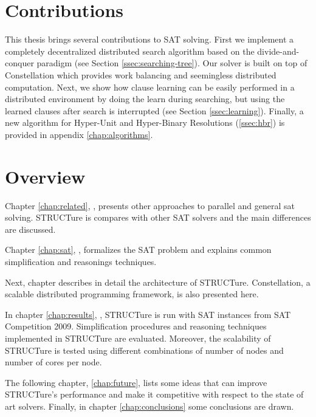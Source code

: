 \section{Contributions}

This thesis brings several contributions to SAT solving. First
we implement a completely decentralized distributed search
algorithm based on the divide-and-conquer paradigm (see Section
\ref{ssec:searching-tree}).  Our solver is built on top of
Constellation which provides work balancing and seemingless
distributed computation.  Next, we show how clause learning can be
easily performed in a distributed environment by doing the learn
during searching, but using the learned clauses after search
is interrupted (see Section \ref{ssec:learning}).  Finally,
a new algorithm for Hyper-Unit and Hyper-Binary Resolutions
(\ref{ssec:hbr}) is provided in appendix \ref{chap:algorithms}.


\section{Overview}

Chapter \ref{chap:related}, , presents other
approaches to parallel and general sat solving. STRUCTure is compares
with other SAT solvers and the main differences are discussed.

Chapter \ref{chap:sat}, , formalizes the SAT
problem and explains common simplification and reasonings techniques.

Next, chapter  describes in detail the
architecture of STRUCTure. Constellation, a scalable distributed
programming framework, is also presented here.

In chapter \ref{chap:results}, , STRUCTure is
run with SAT instances from SAT Competition 2009. Simplification
procedures and reasoning techniques implemented in STRUCTure are
evaluated. Moreover, the scalability of STRUCTure is tested using
different combinations of number of nodes and number of cores
per node.

The following chapter, \ref{chap:future}, lists some ideas that can
improve STRUCTure's performance and make it competitive with respect
to the state of art solvers. Finally, in chapter \ref{chap:conclusions}
some conclusions are drawn.
